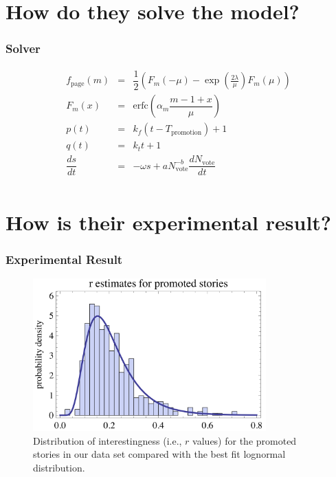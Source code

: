 \documentclass[aspectratio=43]{beamer}
\begin{document}
\section[Solver]{How do they solve the model?}
\begin{frame}
\frametitle{Solver}
\begin{block}{}
\begin{equation}
\begin{array}{lcr}
f_{\mathrm{page}}{\left(m\right)} & = & \dfrac{1}{2}\left(F_m\left(-\mu\right) - \exp{\left(\frac{2\lambda}{\mu}\right)}F_m\left(\mu\right)\right)\\
F_m\left(x\right) & = & \mathrm{erfc}\left(\alpha_m\dfrac{m - 1 + x}{\mu}\right)\\
p\left(t\right) & = & k_f\left(t-T_{\mathrm{promotion}}\right) + 1\\
q\left(t\right) & = & k_t t + 1\\
\dfrac{ds}{dt} & = & -\omega s + a N_{\mathrm{vote}}^{-b}{\dfrac{dN_{\mathrm{vote}}}{dt}}\\
\end{array}
\end{equation}
\end{block}
\end{frame}

\section[Result]{How is their experimental result?}

\begin{frame}
\frametitle{Experimental Result}
\begin{minipage}{\textwidth}
\begin{figure}
\centering
\includegraphics[width=0.8\textwidth]{fig03.PNG}
\caption{Distribution of interestingness (i.e., $r$ values) for the promoted stories in our data set compared with the best fit lognormal distribution.}
\end{figure}
\end{minipage}
\end{frame}
\end{document}
